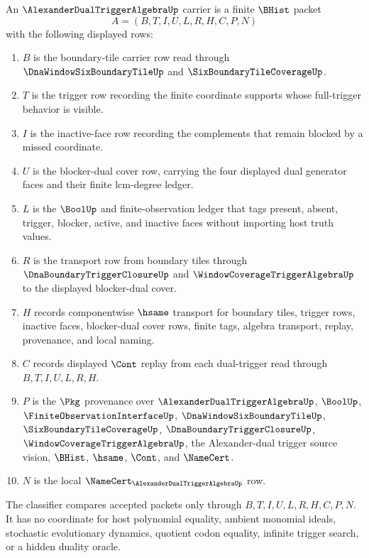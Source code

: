 \begin{definition}
\label{def:alexander-dual-trigger-algebra-carrier}
An $\AlexanderDualTriggerAlgebraUp$ carrier is a finite $\BHist$ packet
$$
A=(B,T,I,U,L,R,H,C,P,N)
$$
with the following displayed rows:
\begin{enumerate}
\item $B$ is the boundary-tile carrier row read through $\DnaWindowSixBoundaryTileUp$ and $\SixBoundaryTileCoverageUp$.
\item $T$ is the trigger row recording the finite coordinate supports whose full-trigger behavior is visible.
\item $I$ is the inactive-face row recording the complements that remain blocked by a missed coordinate.
\item $U$ is the blocker-dual cover row, carrying the four displayed dual generator faces and their finite lcm-degree ledger.
\item $L$ is the $\BoolUp$ and finite-observation ledger that tags present, absent, trigger, blocker, active, and inactive faces without importing host truth values.
\item $R$ is the transport row from boundary tiles through $\DnaBoundaryTriggerClosureUp$ and $\WindowCoverageTriggerAlgebraUp$ to the displayed blocker-dual cover.
\item $H$ records componentwise $\hsame$ transport for boundary tiles, trigger rows, inactive faces, blocker-dual cover rows, finite tags, algebra transport, replay, provenance, and local naming.
\item $C$ records displayed $\Cont$ replay from each dual-trigger read through $B,T,I,U,L,R,H$.
\item $P$ is the $\Pkg$ provenance over $\AlexanderDualTriggerAlgebraUp$, $\BoolUp$, $\FiniteObservationInterfaceUp$, $\DnaWindowSixBoundaryTileUp$, $\SixBoundaryTileCoverageUp$, $\DnaBoundaryTriggerClosureUp$, $\WindowCoverageTriggerAlgebraUp$, the Alexander-dual trigger source vision, $\BHist$, $\hsame$, $\Cont$, and $\NameCert$.
\item $N$ is the local $\NameCert_{\AlexanderDualTriggerAlgebraUp}$ row.
\end{enumerate}
The classifier compares accepted packets only through $B,T,I,U,L,R,H,C,P,N$. It has no coordinate for host polynomial equality, ambient monomial ideals, stochastic evolutionary dynamics, quotient codon equality, infinite trigger search, or a hidden duality oracle.
\end{definition}

